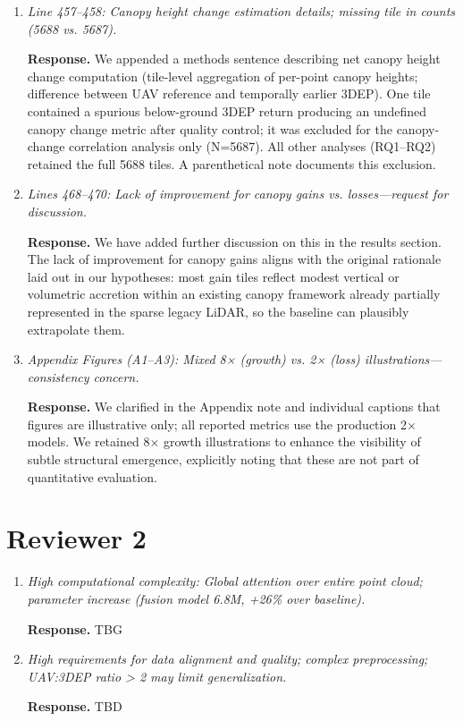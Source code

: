 \documentclass[11pt]{article}
\newcommand{\response}{\textbf{Response.} }
\begin{document}
\begin{enumerate}
  \item \emph{Line 457–458: Canopy height change estimation details; missing tile in counts (5688 vs. 5687).}

  \response We appended a methods sentence describing net canopy height change computation (tile-level aggregation of per-point canopy heights; difference between UAV reference and temporally earlier 3DEP). One tile contained a spurious below-ground 3DEP return producing an undefined canopy change metric after quality control; it was excluded for the canopy-change correlation analysis only (N=5687). All other analyses (RQ1–RQ2) retained the full 5688 tiles. A parenthetical note documents this exclusion.

  \item \emph{Lines 468–470: Lack of improvement for canopy gains vs. losses—request for discussion.}

  \response We have added further discussion on this in the results section. The lack of improvement for canopy gains aligns with the original rationale laid out in our hypotheses: most gain tiles reflect modest vertical or volumetric accretion within an existing canopy framework already partially represented in the sparse legacy LiDAR, so the baseline can plausibly extrapolate them.

  \item \emph{Appendix Figures (A1–A3): Mixed 8× (growth) vs. 2× (loss) illustrations—consistency concern.}

  \response We clarified in the Appendix note and individual captions that figures are illustrative only; all reported metrics use the production 2× models. We retained 8× growth illustrations to enhance the visibility of subtle structural emergence, explicitly noting that these are not part of quantitative evaluation.

\end{enumerate}

\section*{Reviewer 2}

\begin{enumerate}
  \item \emph{High computational complexity: Global attention over entire point cloud; parameter increase (fusion model 6.8M, +26\% over baseline).}

  \response TBG

  \item \emph{High requirements for data alignment and quality; complex preprocessing; UAV:3DEP ratio > 2 may limit generalization.}

  \response TBD
\end{enumerate}
\end{document}

